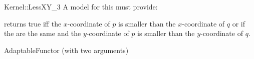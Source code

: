 \begin{ccRefFunctionObjectConcept}{Kernel::LessXY_3}
A model for this must provide:


{returns true iff the $x$-coordinate of $p$ is smaller than the
$x$-coordinate of $q$ or if the are the same and 
the $y$-coordinate of $p$ is smaller than the $y$-coordinate of $q$.}

\ccRefines
AdaptableFunctor (with two arguments)

\ccSeeAlso
{}\\

\end{ccRefFunctionObjectConcept}
